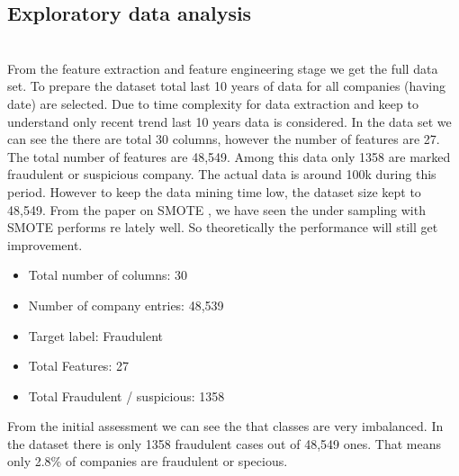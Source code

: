 
\subsection{Exploratory data analysis}\hspace*{\fill} \\

From the feature extraction and feature engineering stage we get the full data set. To prepare the dataset total last 10 years of data for all companies (having  date) are selected. Due to time complexity for data extraction and keep to understand only recent trend last 10 years data is considered. In the data set we can see the there are total 30 columns, however the number of features are 27. The total number of features are 48,549. Among this data only 1358 are marked fraudulent or suspicious company. The actual data is around 100k during this period. However to keep the data mining time low, the dataset size kept to 48,549. From the paper on SMOTE \cite{}, we have seen the under sampling with SMOTE performs re lately well. So theoretically the performance will still get improvement.
\begin{itemize}
    \item Total number of columns: 30
    \item Number of company entries: 48,539
    \item Target label: Fraudulent
    \item Total Features: 27
    \item Total Fraudulent / suspicious: 1358
\end{itemize}

From the initial assessment we can see the that classes are very imbalanced. In the dataset there is only 1358 fraudulent cases out of 48,549 ones. That means only 2.8\% of companies are fraudulent or specious. 


